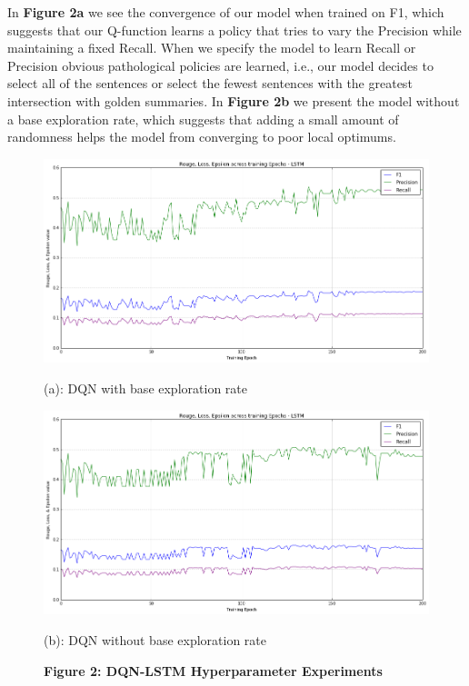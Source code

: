 \documentclass[12pt]{article}
\begin{document}
In \textbf{Figure 2a} we see the convergence of our model when trained on F1, which suggests that our Q-function learns a policy that tries to vary the Precision while maintaining a fixed Recall. When we specify the model to learn Recall or Precision obvious pathological policies are learned, i.e., our model decides to select all of the sentences or select the fewest sentences with the greatest intersection with golden summaries. In  \textbf{Figure 2b} we present the model without a base exploration rate, which suggests that adding a small amount of randomness helps the model from converging to poor local optimums.  

\begin{figure}[!tbp]
  \centering
  \begin{minipage}[b]{0.4\textwidth}
    \captionsetup{labelformat=empty}
    \includegraphics[width=\textwidth]{dqn_with_base}
    \caption{ \scriptsize (a): DQN with base exploration rate}
  \end{minipage}
  \hfill
  \begin{minipage}[b]{0.4\textwidth}
    \captionsetup{labelformat=empty}
    \includegraphics[width=\textwidth]{dqn_no_base}
    \caption{\scriptsize (b): DQN without base exploration rate}
  \end{minipage}
    \captionsetup{labelformat=empty}
    \caption{\textbf{Figure 2: DQN-LSTM Hyperparameter Experiments}}
\end{figure}
\end{document}
